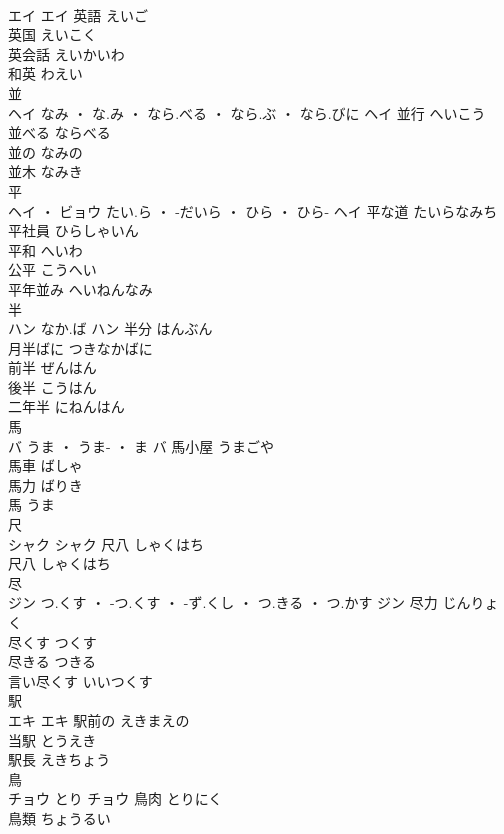 \documentclass[8pt]{extreport}
\begin{document}
\begin{CJK}{UTF8}{min}
\\	エイ		エイ	英語	えいご	
\\	英国	えいこく	
\\	英会話	えいかいわ	
\\	和英	わえい	
\\	並	
\\	ヘイ	なみ ・ な.み ・ なら.べる ・ なら.ぶ ・ なら.びに	ヘイ	並行	へいこう	
\\	並べる	ならべる	
\\	並の	なみの	
\\	並木	なみき	
\\	平	
\\	ヘイ ・ ビョウ	たい.ら ・ -だいら ・ ひら ・ ひら-	ヘイ	平な道	たいらなみち	
\\	平社員	ひらしゃいん	
\\	平和	へいわ	
\\	公平	こうへい	
\\	平年並み	へいねんなみ	
\\	半	
\\	ハン	なか.ば	ハン	半分	はんぶん	
\\	月半ばに	つきなかばに	
\\	前半	ぜんはん	
\\	後半	こうはん	
\\	二年半	にねんはん	
\\	馬	
\\	バ	うま ・ うま- ・ ま	バ	馬小屋	うまごや	
\\	馬車	ばしゃ	
\\	馬力	ばりき	
\\	馬	うま	
\\	尺	
\\	シャク		シャク	尺八	しゃくはち	
\\	尺八	しゃくはち	
\\	尽	
\\	ジン	つ.くす ・ -つ.くす ・ -ず.くし ・ つ.きる ・ つ.かす	ジン	尽力	じんりょく	
\\	尽くす	つくす	
\\	尽きる	つきる	
\\	言い尽くす	いいつくす	
\\	駅	
\\	エキ		エキ	駅前の	えきまえの	
\\	当駅	とうえき	
\\	駅長	えきちょう	
\\	鳥	
\\	チョウ	とり	チョウ	鳥肉	とりにく	
\\	鳥類	ちょうるい	

\end{CJK}
\end{document}
